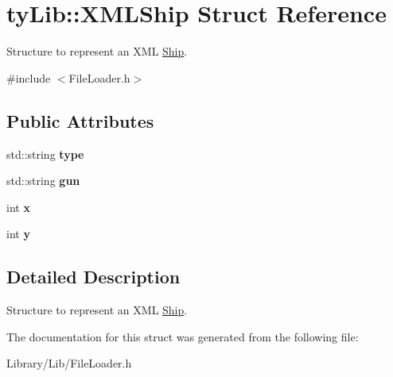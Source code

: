 \hypertarget{structty_lib_1_1_x_m_l_ship}{}\section{ty\+Lib\+:\+:X\+M\+L\+Ship Struct Reference}
\label{structty_lib_1_1_x_m_l_ship}


Structure to represent an X\+M\+L \hyperlink{classty_lib_1_1_ship}{Ship}.  




{\ttfamily \#include $<$File\+Loader.\+h$>$}

\subsection*{Public Attributes}
\begin{DoxyCompactItemize}
\item 
\hypertarget{structty_lib_1_1_x_m_l_ship_afc154ff45ab563f2e2abddc3aaa8bf71}{}std\+::string {\bfseries type}\label{structty_lib_1_1_x_m_l_ship_afc154ff45ab563f2e2abddc3aaa8bf71}

\item 
\hypertarget{structty_lib_1_1_x_m_l_ship_afbec81f6b429e39a8cb7b9e697bae74c}{}std\+::string {\bfseries gun}\label{structty_lib_1_1_x_m_l_ship_afbec81f6b429e39a8cb7b9e697bae74c}

\item 
\hypertarget{structty_lib_1_1_x_m_l_ship_a7ad5e014827f17691dfe07ca809460d4}{}int {\bfseries x}\label{structty_lib_1_1_x_m_l_ship_a7ad5e014827f17691dfe07ca809460d4}

\item 
\hypertarget{structty_lib_1_1_x_m_l_ship_a1480fa60c3aaa36f0f1f360eae23ab93}{}int {\bfseries y}\label{structty_lib_1_1_x_m_l_ship_a1480fa60c3aaa36f0f1f360eae23ab93}

\end{DoxyCompactItemize}


\subsection{Detailed Description}
Structure to represent an X\+M\+L \hyperlink{classty_lib_1_1_ship}{Ship}. 

The documentation for this struct was generated from the following file\+:\begin{DoxyCompactItemize}
\item 
Library/\+Lib/File\+Loader.\+h\end{DoxyCompactItemize}
